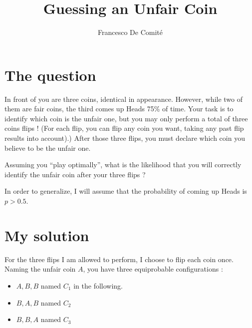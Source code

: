 \documentclass[11pt]{article}
\title{Guessing an Unfair Coin}
\author{Francesco De Comité}
\date{}				%
\begin{document}
\maketitle
\vspace{-1.2cm}

\thispagestyle{empty}



\section*{The question}
In front of you are three coins, identical in appearance. However, while two of them are fair coins, the third comes up Heads 75\% of time. Your task is to identify which coin is the unfair one, but you may only perform a total of three coins flips ! (For each flip, you can flip any coin you want, taking any past flip results into account).) After those three flips, you must declare which coin you believe to be the unfair one. 

Assuming you ``play optimally'', what is the likelihood that you will correctly identify the unfair coin after your three flips ? 

In order to generalize, I will assume that the probability of coming up Heads is $p>0.5$.


\section*{My solution}
For the three flips I am allowed to perform, I choose to flip each coin once. Naming the unfair coin $A$, you have three equiprobable configurations : 
\begin{itemize}
\item $A,B,B$ named $C_1$ in the following. 
\item $B,A,B$ named $C_2$
\item $B,B,A$ named $C_3$
\end{itemize}
\end{document}
